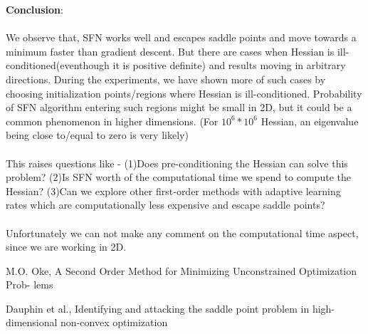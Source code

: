 
\textbf{Conclusion}:
\\\\We observe that, SFN works well and escapes saddle points and move towards a minimum faster than gradient descent. But there are cases when Hessian is ill-conditioned(eventhough it is positive definite) and results moving in arbitrary directions. During the experiments, we have shown more of such cases by choosing initialization points/regions where Hessian is ill-conditioned. Probability of SFN algorithm entering such regions might be small in 2D, but it could be a common phenomenon in higher dimensions. (For $10^6*10^6$ Hessian, an eigenvalue being close to/equal to zero is very likely) 
\\\\This raises questions like - (1)Does pre-conditioning the Hessian can solve this problem? (2)Is SFN worth of the computational time we spend to compute the Hessian? (3)Can we explore other first-order methods with adaptive learning rates which are computationally less expensive and escape saddle points?
\\\\Unfortunately we can not make any comment on the computational time aspect, since we are working in 2D.


\begin{thebibliography}{9}

  M.O. Oke, A Second Order Method for Minimizing Unconstrained Optimization Prob-
lems

Dauphin et al., Identifying and attacking the saddle point problem in high-
dimensional non-convex optimization

\end{thebibliography}


